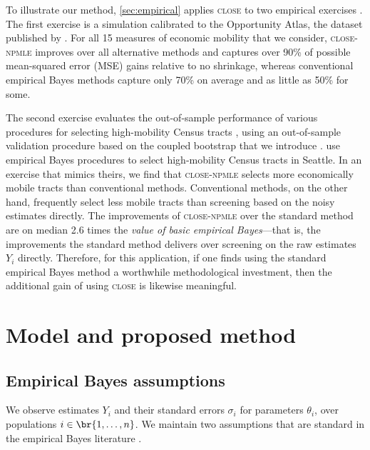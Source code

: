 \documentclass[12pt, reqno]{amsart}
\newcommand{\close}{\textsc{close}}
\newcommand{\npmle}{\textsc{npmle}}
\newcommand{\closenpmle}{\close-\npmle}
\numberwithin{equation}{section}
\begin{document}
To illustrate our method, \cref{sec:empirical} applies \close{} to two empirical
exercises \citep{chetty2018opportunity,bergman2019creating}. The
first exercise is a simulation calibrated to the Opportunity Atlas, the
dataset published by \citet{chetty2018opportunity}. For all 15
measures of economic mobility that we consider,
\closenpmle{} improves over all alternative methods and captures over 90\% of possible
 mean-squared error (MSE) gains relative to no shrinkage, whereas conventional empirical
 Bayes methods capture only 70\% on average and as little as 50\% for some.

The second exercise evaluates the out-of-sample performance of various procedures for 
selecting high-mobility Census tracts \citep{bergman2019creating}, using an out-of-sample
validation procedure based on the coupled bootstrap that we introduce
\citep{oliveira2021unbiased}. \citet {bergman2019creating} use empirical Bayes procedures
to select high-mobility Census tracts in Seattle. In an exercise that mimics theirs, we
find that \closenpmle{} selects more economically mobile tracts than conventional methods.
Conventional methods, on the other hand, frequently select less mobile tracts than
screening based on the noisy estimates directly. The improvements of
\closenpmle{} over the standard method are on median 2.6 times the \emph{value of basic
empirical Bayes}---that is, the improvements the standard method delivers over screening
on the raw estimates $Y_i$ directly. Therefore, for this application, if one finds using
the standard empirical Bayes method a worthwhile methodological investment, then the
additional gain of using \close{} is likewise meaningful.


\section{Model and proposed method}
\label{sec:model}

\subsection{Empirical Bayes assumptions} We observe estimates $Y_i$ and
their standard errors $\sigma_i$ for parameters $\theta_i$, over populations $i \in
\br{1,\ldots,n}$. We maintain two assumptions that are standard in the empirical Bayes
literature
\citep{gilraine2020new,jiang2020general,soloff2021multivariate,gu2023invidious,guwalters_eb,eb_hole}.
\end{document}
